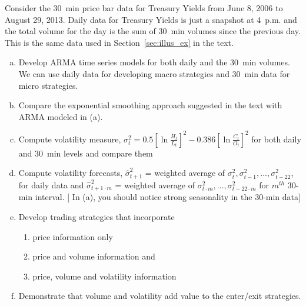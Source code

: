 \prob Consider the 30~min price bar data for Treasury Yields from June 8, 2006 to August 29, 2013. Daily data for Treasury Yields is just a snapshot at 4~p.m. and the total volume for the day is the sum of 30~min volumes since the previous day. This is the same data used in Section~\ref{sec:illus_ex} in the text.
   \begin{enumerate}[(a)]
   \item Develop ARMA time series models for both daily and the 30~min volumes. We can use daily data
for developing macro strategies and 30~min data for micro strategies.
\item Compare the exponential smoothing approach suggested in the text with ARMA modeled in (a).
   \item Compute volatility measure, $\sigma_t^2 = 0.5[\ln{\frac{H_t}{L_t}}]^2 - 0.386[\ln{\frac{C_t}{O_t}}]^2$ for both daily and 30~min levels and compare them
   \item Compute volatility forecasts, $\hat{\sigma}_{t+1}^2$ = weighted average of $\sigma_{t}^2, \sigma_{t-1}^2,...,\sigma_{t-22}^2$, for daily data and $\hat{\sigma}_{t+1\cdot m}^2$ = weighted average of $\sigma_{t\cdot m}^2,...,\sigma_{t-22\cdot m}^2$ for $m^{th}$ 30-min interval. [ In (a), you should notice strong seasonality in the 30-min data]
   \item Develop trading strategies that incorporate
      \begin{enumerate}
      \item price information only
      \item price and volume information and
      \item price, volume and volatility information
      \end{enumerate}
         \item Demonstrate that volume and volatility add value to the enter/exit strategies. \twomedskip
   \end{enumerate}